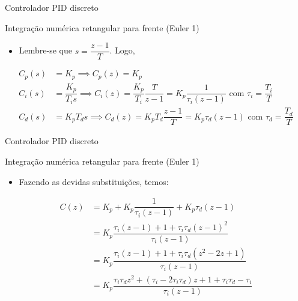 \begin{frame}{Controlador PID discreto}
\begin{block}{Integração numérica retangular para frente (Euler 1)}
\begin{itemize}
    \item Lembre-se que $ s=\dfrac{z-1}{T} $. Logo,
\end{itemize}
\vspace{0.2cm}
	\begin{align*}
	    C_p(s) &= K_p \implies C_p(z) = K_p \\
		C_i(s) &= \dfrac{K_p}{T_i s} \implies C_i(z) =\dfrac{K_p}{T_i}\dfrac{T}{z-1}=K_p\dfrac{1}{\tau_i(z-1)} \text{ com }\tau_i=\dfrac{T_i}{T}\\
		C_d(s) &= K_p T_d s \implies C_d(z)=K_p T_d\dfrac{z-1}{T}=K_p \tau_d(z-1)\text{ com }\tau_d=\dfrac{T_d}{T}
	\end{align*}
\end{block}
\end{frame}
 

\begin{frame}{Controlador PID discreto}
\begin{block}{Integração numérica retangular para frente (Euler 1)}
\begin{itemize}
    \item Fazendo as devidas substituições, temos:
\end{itemize}
	\begin{align*}
		C(z)&=K_p+K_p\dfrac{1}{\tau_i(z-1)}+K_p\tau_d(z-1)\\
		&=K_p\dfrac{\tau_i(z-1)+1+\tau_i\tau_d(z-1)^{2}}{\tau_i(z-1)}\\
		&=K_p\dfrac{\tau_i(z-1)+1+\tau_i\tau_d(z^{2}-2z+1)}{\tau_i(z-1)}\\
		&=K_p\dfrac{\tau_i\tau_d z^{2}+(\tau_i-2\tau_i\tau_d)z+1+\tau_i\tau_d-\tau_i}{\tau_i(z-1)}
	\end{align*}
\end{block}
\end{frame}


